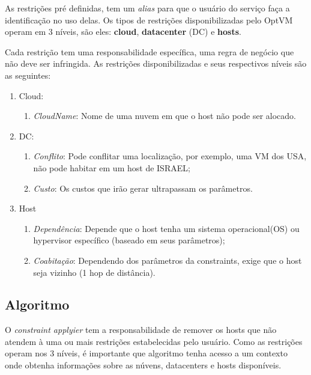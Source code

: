 As restrições pré definidas, tem um \textit{alias} para que o usuário do serviço faça a identificação no uso delas.
Os tipos de restrições disponibilizadas pelo OptVM operam em 3 níveis, são eles: \textbf{cloud}, \textbf{datacenter} (DC)
e \textbf{hosts}.

Cada restrição tem uma responsabilidade específica, uma regra de negócio que não deve ser infringida. 
As restrições disponibilizadas e seus respectivos níveis são as seguintes:

\begin{enumerate}
  \item Cloud:
  \begin{enumerate}
    \item \textit{CloudName}: Nome de uma nuvem em que o host não pode ser alocado.
  \end{enumerate}

  \item DC:
  \begin{enumerate}
    \item \textit{Conflito}: Pode conflitar uma localização, por exemplo, uma VM dos USA, não pode habitar em um host de ISRAEL;
    \item \textit{Custo}: Os custos que irão gerar ultrapassam os parâmetros.
  \end{enumerate}

 \item Host
  \begin{enumerate}
    \item \textit{Dependência}: Depende que o host tenha um sistema operacional(OS) ou hypervisor específico (baseado em seus parâmetros);
    \item \textit{Coabitação}: Dependendo dos parâmetros da constraints, exige que o host seja vizinho (1 hop de distância).
  \end{enumerate}
  
\end{enumerate}

\subsection{Algoritmo}
O \textit{constraint applyier} tem a responsabilidade de remover os hosts que não atendem à
uma ou mais restrições estabelecidas pelo usuário. Como as restrições operam nos 3 níveis,
é importante que algoritmo tenha acesso a um contexto onde obtenha informações sobre as núvens, 
datacenters e hosts disponíveis.

